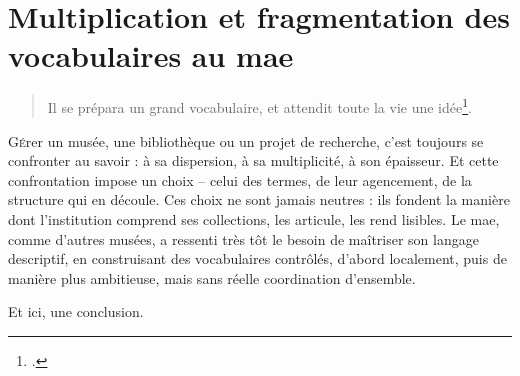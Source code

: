 \chapter[Les vocabulaires contrôlés au \ac{mae}]{\label{II-A} Multiplication et fragmentation des vocabulaires au \ac{mae}}

\begin{quote}
	\og Il se prépara un grand vocabulaire, et attendit toute la vie une idée\footcite{barney_pensees_1920}.\fg
\end{quote}

\lettrine{G}érer un musée, une bibliothèque ou un projet de recherche, c’est toujours se confronter au savoir : à sa dispersion, à sa multiplicité, à son épaisseur. Et cette confrontation impose un choix – celui des termes, de leur agencement, de la structure qui en découle. Ces choix ne sont jamais neutres : ils fondent la manière dont l’institution comprend ses collections, les articule, les rend lisibles. Le \ac{mae}, comme d’autres musées, a ressenti très tôt le besoin de maîtriser son langage descriptif, en construisant des vocabulaires contrôlés, d’abord localement, puis de manière plus ambitieuse, mais sans réelle coordination d’ensemble.






\bigskip
\bigskip
\bigskip

Et ici, une conclusion.